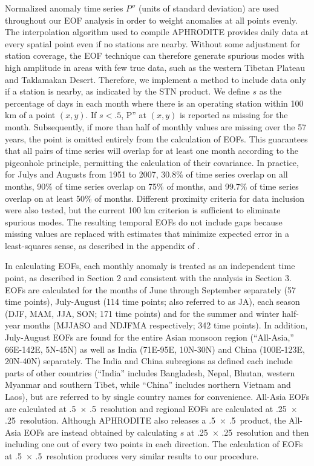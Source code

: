 	Normalized anomaly time series $P''$ (units of standard deviation) are used throughout our EOF analysis in order to weight anomalies at all points evenly. The interpolation algorithm used to compile APHRODITE provides daily data at every spatial point even if no stations are nearby. Without some adjustment for station coverage, the EOF technique can therefore generate spurious modes with high amplitude in areas with few true data, such as the western Tibetan Plateau and Taklamakan Desert. Therefore, we implement a method to include data only if a station is nearby, as indicated by the STN product. We define $s$ as the percentage of days in each month where there is an operating station within 100 km of a point $(x,y)$. If $s<.5$, P'' at $(x,y)$ is reported as missing for the month. Subsequently, if more than half of monthly values are missing over the 57 years, the point is omitted entirely from the calculation of EOFs. This guarantees that all pairs of time series will overlap for at least one month according to the pigeonhole principle, permitting the calculation of their covariance. In practice, for Julys and Augusts from 1951 to 2007, 30.8\% of time series overlap on all months, 90\% of time series overlap on 75\% of months, and 99.7\% of time series overlap on at least 50\% of months. Different proximity criteria for data inclusion were also tested, but the current 100 km criterion is sufficient to eliminate spurious modes. The resulting temporal EOFs do not include gaps because missing values are replaced with estimates that minimize expected error in a least-squares sense, as described in the appendix of \cite{Chelton1982}. 
	
	In calculating EOFs, each monthly anomaly is treated as an independent time point, as described in Section 2 and consistent with the analysis in Section 3. EOFs are calculated for the months of June through September separately (57 time points), July-August (114 time points; also referred to as JA), each season (DJF, MAM, JJA, SON; 171 time points) and for the summer and winter half-year months (MJJASO and NDJFMA respectively; 342 time points). In addition, July-August EOFs are found for the entire Asian monsoon region (``All-Asia,'' 66\textdegree E-142\textdegree E, 5\textdegree N-45\textdegree N)  as well as India (71\textdegree E-95\textdegree E, 10\textdegree N-30\textdegree N) and China (100\textdegree E-123\textdegree E, 20\textdegree N-40\textdegree N) separately. The India and China subregions as defined each include parts of other countries (``India'' includes Bangladesh, Nepal, Bhutan, western Myanmar and southern Tibet, while ``China'' includes northern Vietnam and Laos), but are referred to by single country names for convenience. All-Asia EOFs are calculated at .5\textdegree\ $\times$ .5\textdegree\ resolution and regional EOFs are calculated at .25\textdegree\ $\times$ .25\textdegree\ resolution. Although APHRODITE also releases a .5\textdegree\ $\times$ .5\textdegree\ product, the All-Asia EOFs are instead obtained by calculating $s$ at .25\textdegree\ $\times$ .25\textdegree\ resolution and then including one out of every two points in each direction. The calculation of EOFs at .5\textdegree\ $\times$ .5\textdegree\ resolution produces very similar results to our procedure. 
	
